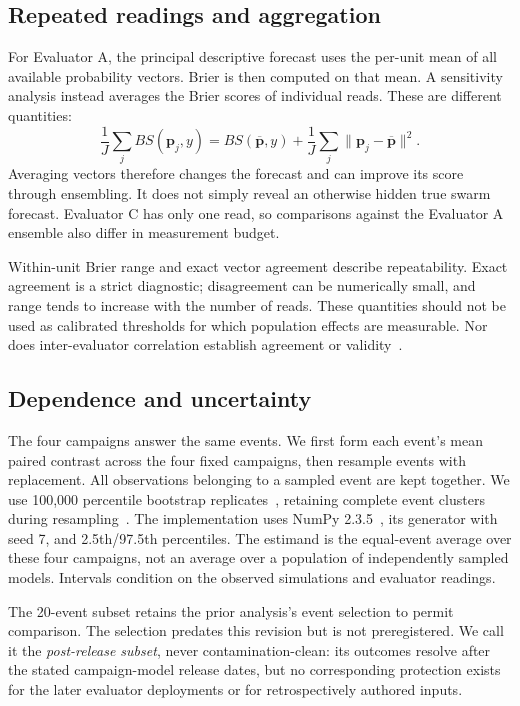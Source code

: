 \documentclass[10pt,conference]{IEEEtran}
\begin{document}
\subsection{Repeated readings and aggregation}
For Evaluator A, the principal descriptive forecast uses the per-unit mean
of all available probability vectors. Brier is then computed on that mean.
A sensitivity analysis instead averages the Brier scores of individual reads.
These are different quantities:
\begin{equation}
 \frac{1}{J}\sum_j BS(\mathbf p_j,y)
 =BS(\overline{\mathbf p},y)
 +\frac{1}{J}\sum_j\|\mathbf p_j-\overline{\mathbf p}\|^2.
\end{equation}
Averaging vectors therefore changes the forecast and can improve its score
through ensembling. It does not simply reveal an otherwise hidden true
swarm forecast. Evaluator C has only one read, so comparisons against the
Evaluator A ensemble also differ in measurement budget.

Within-unit Brier range and exact vector agreement describe repeatability.
Exact agreement is a strict diagnostic; disagreement can be numerically small,
and range tends to increase with the number of reads. These quantities should
not be used as calibrated thresholds for which population effects are measurable.
Nor does inter-evaluator correlation establish agreement or
validity~\cite{bland1986agreement}.

\subsection{Dependence and uncertainty}
\label{sec:inference}
The four campaigns answer the same events. We first form each event's mean
paired contrast across the four fixed campaigns, then resample events with
replacement. All observations belonging to a sampled event are kept together.
We use 100,000 percentile bootstrap replicates~\cite{efron1979}, retaining
complete event clusters during resampling~\cite{cameron2008cluster}. The
implementation uses NumPy 2.3.5~\cite{harris2020numpy}, its generator with seed 7,
and 2.5th/97.5th percentiles. The estimand is the equal-event average over these
four campaigns, not an average over a population of independently sampled models.
Intervals condition on the observed simulations and evaluator readings.

The 20-event subset retains the prior analysis's event selection to permit
comparison. The selection predates this revision but is not preregistered.
We call it the \emph{post-release subset}, never contamination-clean:
its outcomes resolve after the stated campaign-model release dates, but no
corresponding protection exists for the later evaluator deployments or for
retrospectively authored inputs.
\end{document}
